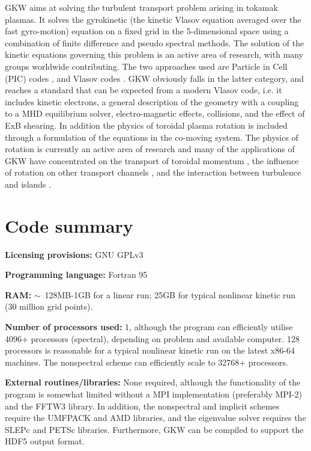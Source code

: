 GKW aims at solving the turbulent transport problem arising in tokamak plasmas. It solves
the gyrokinetic (the kinetic Vlasov equation averaged over the fast gyro-motion) equation on a fixed
grid in the 5-dimensional space using a combination of finite difference and pseudo spectral
methods. The solution of the kinetic equations governing this problem is an active area of 
research, with many groups worldwide contributing. The two approaches used are Particle in Cell 
(PIC) codes \cite{PAR93,LIN98,IDO03,HEI04,BOT07,JOL07,GRA06}, and Vlasov codes 
\cite{KOT95,DOR00,JEN00,DAN05,CAN03}. GKW obviously falls in the latter category, and 
reaches a standard that can be expected from a modern Vlasov code, i.e. it includes kinetic 
electrons, a general description of the geometry with a coupling to a MHD equilibrium solver, 
electro-magnetic effects, collisions, and the effect of ExB shearing. In addition the physics of 
toroidal plasma rotation is included through a formulation of the equations in the co-moving system.   
The physics of rotation is currently an active area of research and many of the applications of 
GKW have concentrated on the transport of toroidal momentum \cite{PEE07,PEE05,PEE06,
PEE09com,PEE09,CAM09,PEE09scmode,CAM09pop,CAS09}, the influence of rotation on 
other transport channels \cite{CAM09rot,CAS10}, and the interaction between turbulence and islands \cite{HOR10,HOR10epl}.

\section*{Code summary}

{\bf Licensing provisions:} GNU GPLv3

{\bf Programming language:} Fortran 95

{\bf RAM:} $\sim$~128MB-1GB for a linear run; 25GB for typical nonlinear kinetic run (30 million grid points).

{\bf Number of processors used:} 1, although the program can efficiently utilise 4096+ processors (spectral), depending on problem and available computer. 128 processors is reasonable for a typical nonlinear kinetic run on the latest x86-64 machines.  The nonspectral scheme can efficiently scale to 32768+ processors.

{\bf External routines/libraries:}  None required, although the functionality of the program is somewhat
limited without a MPI implementation (preferably MPI-2) and the FFTW3 library.  In addition, the nonspectral and
implicit schemes require the UMFPACK and AMD libraries, and the eigenvalue solver requires the SLEPc and PETSc libraries. Furthermore, GKW can be compiled to support the HDF5 output format.

